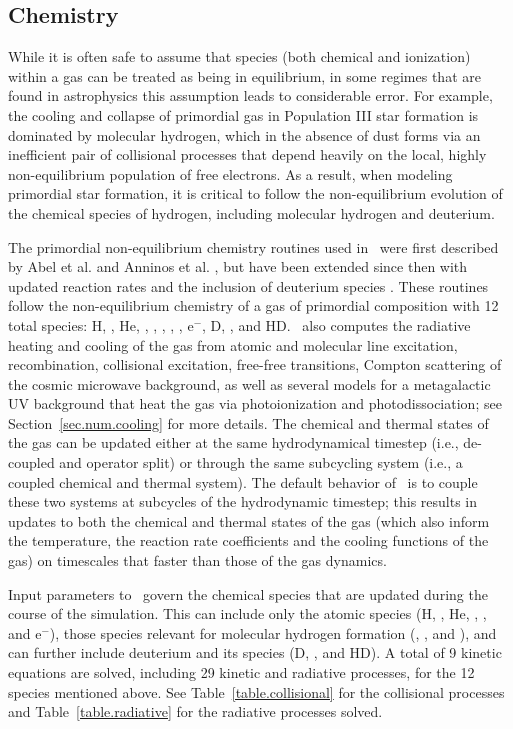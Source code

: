 \subsection{Chemistry}
\label{sec.num.chemistry}

While it is often safe to assume that species (both chemical and ionization)
within a gas can be treated as being in equilibrium, in some regimes that are
found in astrophysics this assumption leads to considerable error.  For
example, the cooling and collapse of primordial gas in Population III star
formation is dominated by molecular hydrogen, which in the absence of dust
forms via an inefficient pair of collisional processes that depend heavily on
the local, highly non-equilibrium population of free electrons.  As a result,
when modeling primordial star formation, it is critical to follow the
non-equilibrium evolution of the chemical species of hydrogen, including
molecular hydrogen and deuterium.

The primordial non-equilibrium chemistry routines used in \enzo\ were first
described by Abel et al. and Anninos et al. \citep{abel97,anninos97}, but have
been extended since then with updated reaction rates and the inclusion of
deuterium species \citep{2009PhDT.........5T}.  These routines follow the
non-equilibrium chemistry of a gas of primordial composition with 12 total
species: H, \Hp, He, \Hep, \Hepp, \Hm, \HHp, \HH, e$^-$, D, \Dp, and HD.  \enzo\
also computes the radiative heating and cooling of the gas from atomic and
molecular line excitation, recombination, collisional excitation, free-free
transitions, Compton scattering of the cosmic microwave background, as well as
several models for a metagalactic UV background that heat the gas via
photoionization and photodissociation; see Section~\ref{sec.num.cooling} for
more details.  The chemical and thermal states of the gas can be updated either
at the same hydrodynamical timestep (i.e., de-coupled and operator split) or
through the same subcycling system (i.e., a coupled chemical and thermal
system).  The default behavior of \enzo\ is to couple these two systems at
subcycles of the hydrodynamic timestep; this results in updates to both the
chemical and thermal states of the gas (which also inform the temperature, the
reaction rate coefficients and the cooling functions of the gas) on timescales
that faster than those of the gas dynamics.

Input parameters to \enzo\ govern the chemical species that are updated during
the course of the simulation.  This can include only the atomic species (H,
\Hp, He, \Hep, \Hepp, and e$^-$), those species relevant for molecular hydrogen
formation (\HH, \HHp, and \Hm), and can further include deuterium and its
species (D, \Dp, and HD).  A total of 9 kinetic equations are solved, including
29 kinetic and radiative processes, for the 12 species mentioned above.  See
Table~\ref{table.collisional} for the collisional processes and
Table~\ref{table.radiative} for the radiative processes solved.

